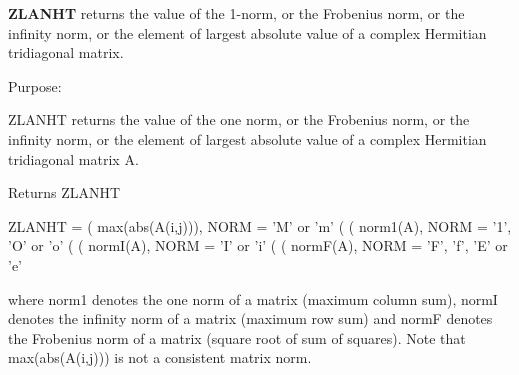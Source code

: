 {\bfseries Z\+L\+A\+N\+H\+T} returns the value of the 1-\/norm, or the Frobenius norm, or the infinity norm, or the element of largest absolute value of a complex Hermitian tridiagonal matrix. 

 \begin{DoxyParagraph}{Purpose\+: }
\begin{DoxyVerb} ZLANHT  returns the value of the one norm,  or the Frobenius norm, or
 the  infinity norm,  or the  element of  largest absolute value  of a
 complex Hermitian tridiagonal matrix A.\end{DoxyVerb}

\end{DoxyParagraph}
\begin{DoxyReturn}{Returns}
Z\+L\+A\+N\+H\+T \begin{DoxyVerb}    ZLANHT = ( max(abs(A(i,j))), NORM = 'M' or 'm'
             (
             ( norm1(A),         NORM = '1', 'O' or 'o'
             (
             ( normI(A),         NORM = 'I' or 'i'
             (
             ( normF(A),         NORM = 'F', 'f', 'E' or 'e'

 where  norm1  denotes the  one norm of a matrix (maximum column sum),
 normI  denotes the  infinity norm  of a matrix  (maximum row sum) and
 normF  denotes the  Frobenius norm of a matrix (square root of sum of
 squares).  Note that  max(abs(A(i,j)))  is not a consistent matrix norm.\end{DoxyVerb}
 
\end{DoxyReturn}

